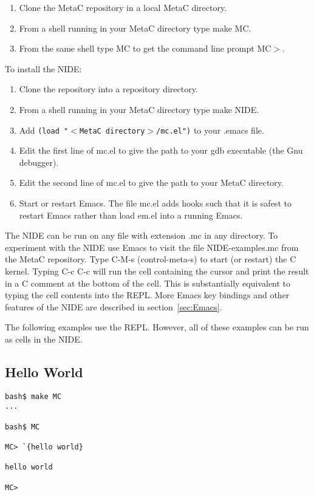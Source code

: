 \documentclass{article}
\begin{document}
\begin{enumerate}
\item Clone the MetaC repository in a local MetaC directory.
\item From a shell running in your MetaC directory type make MC.
\item From the same shell type MC to get the command line prompt MC$>$.
\end{enumerate}

\noindent To install the NIDE:

\begin{enumerate}
\item Clone the repository into a repository directory.
\item From a shell running in your MetaC directory type make NIDE.
\item Add {\tt (load "$<$MetaC directory$>$/mc.el")} to your .emacs file.
\item Edit the first line of  mc.el to give the path to your gdb executable (the Gnu debugger).
\item Edit the second line of mc.el to give the path to your MetaC directory.
\item Start or restart Emacs. The file mc.el adds hooks such that it is safest to restart Emacs rather than load em.el into a running Emacs.
\end{enumerate}

\noindent The NIDE can be run on any file with extension .mc in any directory.  To experiment with the NIDE use Emacs to visit the file NIDE-examples.mc from the MetaC repository.  
Type C-M-s (control-meta-s) to start (or restart) the C kernel. Typing C-c C-c will run the cell containing the cursor and print
the result in a C comment at the bottom of the cell.  This is substantially equivalent to typing the cell contents into the REPL.
More Emacs key bindings and other features of the NIDE are described in section~\ref{sec:Emacs}.

\medskip
\noindent The following examples use the REPL.  However, all of these examples can be run as cells in the NIDE.

\subsection{Hello World}
\label{sec:hello}

\begin{verbatim}
bash$ make MC
...

bash$ MC

MC> `{hello world}

hello world

MC>
\end{verbatim}
\end{document}
